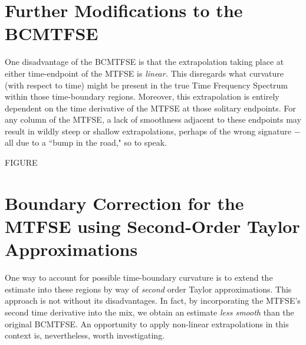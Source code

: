 \documentclass{article}
\begin{document}
\pagecolor{salt}\color{pepper}

\section{Further Modifications to the BCMTFSE}
One disadvantage of the BCMTFSE is that the extrapolation taking place at either time-endpoint of the MTFSE is \textit{linear.} This disregards what curvature (with respect to time) might be present in the true Time Frequency Spectrum within those time-boundary regions. Moreover, this extrapolation is entirely dependent on the time derivative of the MTFSE at those solitary endpoints. For any column of the MTFSE, a lack of smoothness adjacent to these endpoints may result in wildly steep or shallow extrapolations, perhaps of the wrong signature $-$ all due to a ``bump in the road," so to speak.

FIGURE

\section{Boundary Correction for the MTFSE using Second-Order Taylor Approximations}
One way to account for possible time-boundary curvature is to extend the estimate into these regions by way of \textit{second} order Taylor approximations. This approach is not without its disadvantages. In fact, by incorporating the MTFSE's second time derivative into the mix, we obtain an estimate \textit{less smooth} than the original BCMTFSE. An opportunity to apply non-linear extrapolations in this context is, nevertheless, worth investigating.
\end{document}
